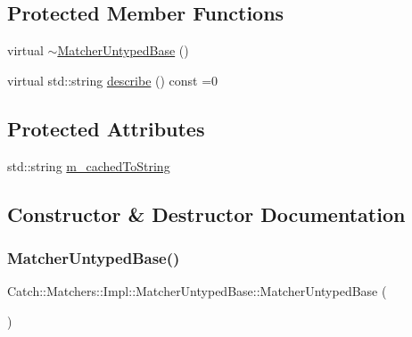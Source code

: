 \subsection*{Protected Member Functions}
\begin{DoxyCompactItemize}
\item 
virtual \mbox{\hyperlink{class_catch_1_1_matchers_1_1_impl_1_1_matcher_untyped_base_a853be93ce33f71b5abede38081c79e9d}{$\sim$\+Matcher\+Untyped\+Base}} ()
\item 
virtual std\+::string \mbox{\hyperlink{class_catch_1_1_matchers_1_1_impl_1_1_matcher_untyped_base_a91d3a907dbfcbb596077df24f6e11fe2}{describe}} () const =0
\end{DoxyCompactItemize}
\subsection*{Protected Attributes}
\begin{DoxyCompactItemize}
\item 
std\+::string \mbox{\hyperlink{class_catch_1_1_matchers_1_1_impl_1_1_matcher_untyped_base_a951095c462657e7097a9a6dc4dde813f}{m\+\_\+cached\+To\+String}}
\end{DoxyCompactItemize}


\subsection{Constructor \& Destructor Documentation}
\mbox{\label{class_catch_1_1_matchers_1_1_impl_1_1_matcher_untyped_base_ab65764dc245d85e2b268d3be870b650a}} 
\subsubsection{\texorpdfstring{MatcherUntypedBase()}{MatcherUntypedBase()}\hspace{0.1cm}{\footnotesize\ttfamily [1/2]}}
{\footnotesize\ttfamily Catch\+::\+Matchers\+::\+Impl\+::\+Matcher\+Untyped\+Base\+::\+Matcher\+Untyped\+Base (\begin{DoxyParamCaption}{ }\end{DoxyParamCaption})\hspace{0.3cm}{\ttfamily [default]}}

